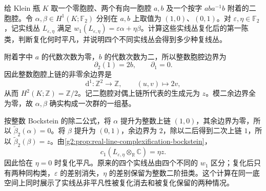 \begin{exercise}\label{g2:ex:klein-line-complexification}
	给 Klein 瓶 \(K\) 取一个零胞腔、两个有向一胞腔 \(a,b\) 及一个按字 \(aba^{-1}b\) 附着的二胞腔。令 \(\alpha,\beta\in H^1(K;\mathbb F_2)\) 分别在 \(a,b\) 上取值为 \((1,0)\)、\((0,1)\)。对 \(\varepsilon,\eta\in\mathbb F_2\)，记实线丛 \(L_{\varepsilon,\eta}\) 满足 \(w_1(L_{\varepsilon,\eta})=\varepsilon\alpha+\eta\beta\)。计算这些实线丛复化后的第一陈类，判断复化何时平凡，并说明四个不同实线丛会得到多少种复线丛。
\end{exercise}
\begin{solution}
	附着字中 \(a\) 的代数次数为零，\(b\) 的代数次数为二，所以整数胞腔边界为
	\[
		\partial_2(1)=2b,\qquad\partial_1=0.
	\]
	因此整数胞腔上链的非零余边界是
	\[
		\mathrm d^1:\mathbb Z^2\longrightarrow\mathbb Z,\qquad(u,v)\longmapsto2v,
	\]
	从而 \(H^2(K;\mathbb Z)=\mathbb Z/2\)。记二胞腔对偶上链所代表的生成元为 \(z\)。模二余边界全为零，故 \(\alpha,\beta\) 确实构成一次群的一组基。

	按整数 Bockstein 的除二公式，将 \(\alpha\) 提升为整数上链 \((1,0)\)，其余边界为零，所以 \(\widetilde\beta_2(\alpha)=0\)。将 \(\beta\) 提升为 \((0,1)\)，余边界为 \(2\)，除以二后得到二次上链 \(1\)，所以 \(\widetilde\beta_2(\beta)=z\)。由\cref{g2:prop:real-line-complexification-bockstein}，
	\[
		c_1(L_{\varepsilon,\eta}\otimes_{\mathbb R}\mathbb C)=\eta z.
	\]
	因此恰在 \(\eta=0\) 时复化平凡。原来的四个实线丛由四个不同的 \(w_1\) 区分；复化后只有两种同构类，\(\varepsilon\) 的差别消失，\(\eta\) 的差别保留为整数二阶扭类。这个计算在同一底空间上同时展示了实线丛非平凡性被复化消去和被复化保留的两种情况。
\end{solution}

